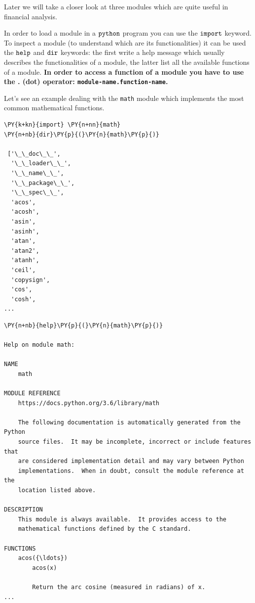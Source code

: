 Later we will take a closer look at three modules which are quite useful in financial analysis.

In order to load a module in a \(\tt{python}\) program you can use the \(\tt{import}\) keyword. To inspect a module (to understand which are its functionalities) it can be used the \(\tt{help}\) and \(\tt{dir}\) keywords: the first write a help message which usually describes the functionalities of a module, the latter list all the available functions of a module.
\textbf{In order to access a function of a module you have to use the . (dot) operator: \texttt{module-name.function-name}.}

Let's see an example dealing with the \texttt{math} module which implements the most common mathematical functions.

\begin{tcolorbox}[breakable, size=fbox, boxrule=1pt, pad at break*=1mm, colback=cellbackground, colframe=cellborder]            
\begin{Verbatim}[commandchars=\\\{\}]
\PY{k+kn}{import} \PY{n+nn}{math}
\PY{n+nb}{dir}\PY{p}{(}\PY{n}{math}\PY{p}{)}

 ['\_\_doc\_\_',
  '\_\_loader\_\_',
  '\_\_name\_\_',
  '\_\_package\_\_',
  '\_\_spec\_\_',
  'acos',
  'acosh',
  'asin',
  'asinh',
  'atan',
  'atan2',
  'atanh',
  'ceil',
  'copysign',
  'cos',
  'cosh',
...
\end{Verbatim}
\end{tcolorbox}

\begin{tcolorbox}[breakable, size=fbox, boxrule=1pt, pad at break*=1mm, colback=cellbackground, colframe=cellborder]            
\begin{Verbatim}[commandchars=\\\{\}]
\PY{n+nb}{help}\PY{p}{(}\PY{n}{math}\PY{p}{)}

Help on module math:

NAME
    math

MODULE REFERENCE
    https://docs.python.org/3.6/library/math

    The following documentation is automatically generated from the Python
    source files.  It may be incomplete, incorrect or include features that
    are considered implementation detail and may vary between Python
    implementations.  When in doubt, consult the module reference at the
    location listed above.

DESCRIPTION
    This module is always available.  It provides access to the
    mathematical functions defined by the C standard.

FUNCTIONS
    acos({\ldots})
        acos(x)

        Return the arc cosine (measured in radians) of x.
...
\end{Verbatim}
\end{tcolorbox}

